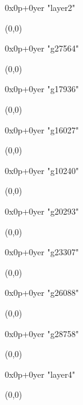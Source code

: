    0x0p+0yer "layer2"
  \begin{textblock}{1}(0,0)
  \end{textblock}

   0x0p+0yer "g27564"
  \begin{textblock}{1}(0,0)
  \end{textblock}

   0x0p+0yer "g17936"
  \begin{textblock}{1}(0,0)
  \end{textblock}

   0x0p+0yer "g16027"
  \begin{textblock}{1}(0,0)
  \end{textblock}

   0x0p+0yer "g10240"
  \begin{textblock}{1}(0,0)
  \end{textblock}

   0x0p+0yer "g20293"
  \begin{textblock}{1}(0,0)
  \end{textblock}

   0x0p+0yer "g23307"
  \begin{textblock}{1}(0,0)
  \end{textblock}

   0x0p+0yer "g26088"
  \begin{textblock}{1}(0,0)
  \end{textblock}

   0x0p+0yer "g28758"
  \begin{textblock}{1}(0,0)
  \end{textblock}

   0x0p+0yer "layer4"
  \begin{textblock}{1}(0,0)
  \end{textblock}

